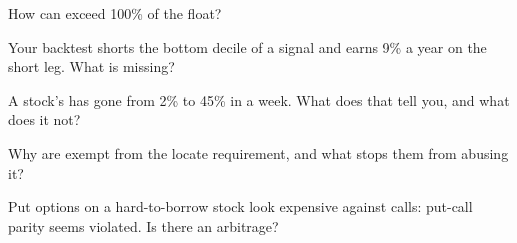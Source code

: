 \begin{interviewq}\label{iq:m1:stock-loan-and-short-selling:2}
How can  exceed 100\% of the float?
\end{interviewq}

\begin{interviewq}\label{iq:m1:stock-loan-and-short-selling:3}
Your backtest shorts the bottom decile of a signal and earns 9\% a year on
the short leg. What is missing?
\end{interviewq}

\begin{interviewq}\label{iq:m1:stock-loan-and-short-selling:4}
A stock's  has gone from 2\% to 45\% in a week. What does that tell
you, and what does it not?
\end{interviewq}

\begin{interviewq}\label{iq:m1:stock-loan-and-short-selling:5}
Why are  exempt from the locate requirement, and what stops
them from abusing it?
\end{interviewq}

\begin{interviewq}\label{iq:m1:stock-loan-and-short-selling:6}
Put options on a hard-to-borrow stock look expensive against calls: put-call
parity seems violated. Is there an arbitrage?
\end{interviewq}
